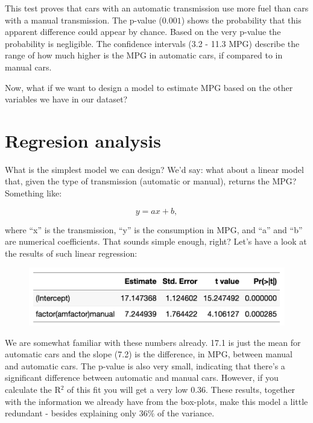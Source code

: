 This test proves that cars with an automatic transmission use more fuel than cars with a manual transmission. The p-value ($0.001$) shows the probability that this apparent difference could appear by chance. Based on the very p-value the probability is negligible. The confidence intervals (3.2 - 11.3 MPG) describe the range of how much higher is the MPG in automatic cars, if compared to in manual cars.

Now, what if we want to design a model to estimate MPG based on the other variables we have in our dataset?


\section{Regresion analysis}\label{RegDA}

What is the simplest model we can design? We'd say: what about a linear model that, given the type of transmission (automatic or manual), returns the MPG? Something like:

\begin{equation}
y = ax + b,
\end{equation}

\noindent where ``x'' is the transmission, ``y'' is the consumption in MPG, and ``a'' and ``b'' are numerical coefficients. That sounds simple enough, right? Let's have a look at the results of such linear regression:

\begin{figure}[ht]
	\begin{center}
			\includegraphics[scale=0.5]{Parts/numerics/linR}
	\end{center}
	\label{fig:linR}
\end{figure}

We are somewhat familiar with these numbers already. 17.1 is just the mean for automatic cars and the slope (7.2) is the difference, in MPG, between manual and automatic cars. The p-value is also very small, indicating that there's a significant difference between automatic and manual cars. However, if you calculate the R$^2$ of this fit you will get a very low 0.36. These results, together with the information we already have from the box-plots, make this model a little redundant - besides explaining only 36$\%$ of the variance.

